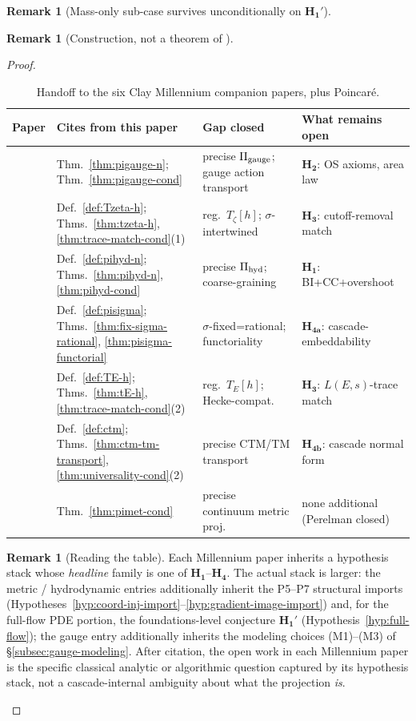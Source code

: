 \documentclass[11pt, a4paper]{amsart}
\theoremstyle{definition}
\newtheorem{remark}[theorem]{Remark}
\newcommand{\hyd}{{\rm hyd}}
\newcommand{\gge}{{\rm gauge}}
\begin{document}
\begin{remark}[Mass-only sub-case survives unconditionally on $\mathbf{H_1'}$]
\begin{remark}[Construction, not a theorem of \cite{CascadeEmbeddings}]
\begin{proof}
\begin{table}[h]
\caption{Handoff to the six Clay Millennium companion papers, plus
Poincar\'e.}
\label{tab:handoff}
\begin{tabular}{p{1.15in}p{1.8in}p{1.3in}p{1.4in}}
\hline
Paper & Cites from this paper & Gap closed & What remains open \\
\hline
\cite{MillenniumYM} &
  Thm.~\ref{thm:pigauge-n}; Thm.~\ref{thm:pigauge-cond} &
  precise $\Pi_{\gge}$; gauge action transport &
  $\mathbf{H_2}$: OS axioms, area law \\
\cite{MillenniumRH} &
  Def.~\ref{def:Tzeta-h}; Thms.~\ref{thm:tzeta-h},
  \ref{thm:trace-match-cond}(1) &
  reg.\ $T_\zeta[h]$; $\sigma$-intertwined &
  $\mathbf{H_3}$: cutoff-removal match \\
\cite{MillenniumNS} &
  Def.~\ref{def:pihyd-n}; Thms.~\ref{thm:pihyd-n},
  \ref{thm:pihyd-cond} &
  precise $\Pi_{\hyd}$; coarse-graining &
  $\mathbf{H_1}$: BI+CC+overshoot \\
\cite{MillenniumHodge} &
  Def.~\ref{def:pisigma}; Thms.~\ref{thm:fix-sigma-rational},
  \ref{thm:pisigma-functorial} &
  $\sigma$-fixed=rational; functoriality &
  $\mathbf{H_{4a}}$: cascade-embeddability \\
\cite{MillenniumBSD} &
  Def.~\ref{def:TE-h}; Thms.~\ref{thm:tE-h},
  \ref{thm:trace-match-cond}(2) &
  reg.\ $T_E[h]$; Hecke-compat.\ &
  $\mathbf{H_3}$: $L(E,s)$-trace match \\
\cite{MillenniumPNP} &
  Def.~\ref{def:ctm}; Thms.~\ref{thm:ctm-tm-transport},
  \ref{thm:universality-cond}(2) &
  precise CTM/TM transport &
  $\mathbf{H_{4b}}$: cascade normal form \\
\cite{MillenniumPoincare} &
  Thm.~\ref{thm:pimet-cond} &
  precise continuum metric proj.\ &
  none additional (Perelman closed) \\
\hline
\end{tabular}
\end{table}

\begin{remark}[Reading the table]
Each Millennium paper inherits a hypothesis stack whose
\emph{headline} family is one of $\mathbf{H_1}$--$\mathbf{H_4}$.
The actual stack is larger: the metric / hydrodynamic entries
additionally inherit the P5--P7 structural imports
(Hypotheses~\ref{hyp:coord-inj-import}--\ref{hyp:gradient-image-import})
and, for the full-flow PDE portion, the foundations-level
conjecture $\mathbf{H_1'}$ (Hypothesis~\ref{hyp:full-flow}); the
gauge entry additionally inherits the modeling choices (M1)--(M3)
of \S\ref{subsec:gauge-modeling}. After citation, the open work
in each Millennium paper is the specific classical analytic or
algorithmic question captured by its hypothesis stack, not a
cascade-internal ambiguity about what the projection \emph{is}.
\end{remark}


\end{proof}
\end{remark}
\end{remark}
\end{document}
